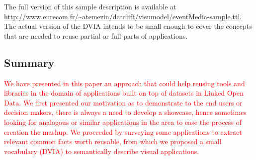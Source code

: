 The full version of this sample description is available at \url{http://www.eurecom.fr/~atemezin/datalift/visumodel/eventMedia-sample.ttl}. The actual version of the DVIA intends to be small enough to cover the concepts that are needed to reuse partial or full parts of applications. 

\begin{figure}[!htbp]
\vspace{-2.5cm}
\end{figure}



\subsection*{Summary} \label{sec:conclusion}
\textcolor{red}{We have presented in this paper an approach that could help reusing tools and libraries in the domain of applications built on top of datasets in Linked Open Data. We first presented our motivation as to demonstrate to the end users or decision makers, there is always a need to develop a showcase, hence sometimes looking for analogous or similar applications in the area to ease the process of creation the mashup. We proceeded by surveying some applications to extract relevant common facts worth reusable, from which we proposed a small vocabulary (DVIA)  to semantically describe visual applications. }

